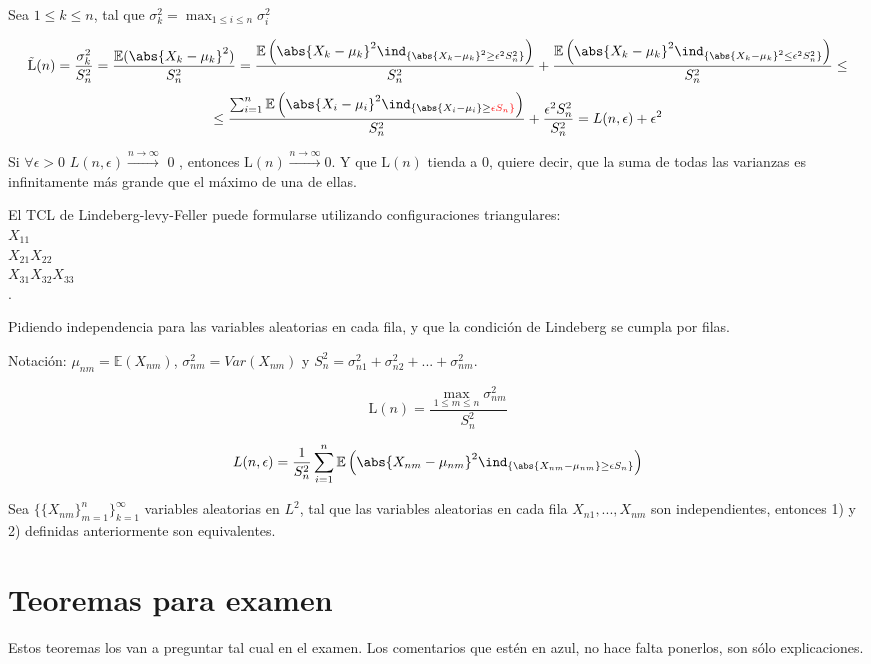 \documentclass{apuntes}
\begin{document}
Sea $1\leq k \leq n$, tal que $\sigma^2_k=\max_{1\leq i \leq n}\sigma_i^2$

\[
\text{\~{L}}(n)=\frac{\sigma^2_k}{S^2_n}=\frac{\mathbb{E}(\abs{X_k-\mu_k}^2)}{S^2_n}=\frac{\mathbb{E}\left( \abs{X_k-\mu_k}^2 \ind_{\{\abs{X_k-\mu_k}^2\geq \epsilon^2 S_n^2\}} \right)}{S_n^2}+\frac{\mathbb{E}\left( \abs{X_k-\mu_k}^2 \ind_{\{\abs{X_k-\mu_k}^2\leq \epsilon^2 S_n^2\}} \right)}{S_n^2} \leq
\]
\[
\leq  \frac{\sum_{i=1}^{n}\mathbb{E}\left( \abs{X_i-\mu_i}^2 \ind_{\{\abs{X_i-\mu_i}\geq \textcolor{red}{\epsilon S_n\}}} \right)}{S^2_n}+\frac{\epsilon^2 S_n^2}{S_n^2} = L(n,\epsilon)+\epsilon^2
\]

Si $\forall \epsilon>0$ $L(n,\epsilon)\stackrel{n \rightarrow \infty}{\rightarrow}$ 0  , entonces $\text{\~{L}}(n)\stackrel{n \rightarrow \infty}{\rightarrow} 0$. Y que $\text{\~{L}}(n)$ tienda a 0, quiere decir, que la suma de todas las varianzas es infinitamente más grande que el máximo de una de ellas.

El TCL de Lindeberg-levy-Feller puede formularse utilizando configuraciones triangulares:\\
$X_{11}$\\
$X_{21} X_{22}$\\
$X_{31} X_{32} X_{33}$\\
.

Pidiendo independencia para las variables aleatorias en cada fila, y que la condición de Lindeberg se cumpla por filas. 

Notación: $\mu_{nm}=\mathbb{E}(X_{nm})$, $\sigma^2_{nm}=Var(X_{nm})$ y $S^2_n=\sigma^2_{n1}+\sigma^2_{n2}+...+\sigma^2_{nm}$.

\[
\text{\~{L}}(n)=\frac{\max_{1\leq m \leq n}\sigma^2_{nm}}{S^2_n}
\]

\[
L(n, \epsilon)=\frac{1}{S_n^2} \sum_{i=1}^{n}\mathbb{E}\left( \abs{X_{nm}-\mu_{nm}}^2 \ind_{\{\abs{X_{nm}-\mu_{nm}}\geq \epsilon S_n\}} \right)
\]

Sea $\{\{ X_{nm} \}^n_{m=1}\}^{\infty}_{k=1}$ variables aleatorias en $L^2$, tal que las variables aleatorias en cada fila $X_{n1},...,X_{nm}$ son independientes, entonces 1) y 2) definidas anteriormente son equivalentes.

\chapter{Teoremas para examen}
Estos teoremas los van a preguntar tal cual en el examen. Los comentarios que estén en azul, no hace falta ponerlos, son sólo explicaciones.
\end{document}
